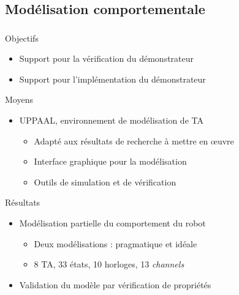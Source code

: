\documentclass{beamer}
\begin{document}
    \subsection{Modélisation comportementale}
      \begin{frame}
        \frametitle{\secname}
        \framesubtitle{\subsecname}

        \begin{block}{Objectifs}
          \begin{itemize}
            \item Support pour la vérification du démonstrateur
            \item Support pour l'implémentation du démonstrateur
          \end{itemize}
        \end{block}
        \pause

        \begin{block}{Moyens}
          \begin{itemize}
            \item {\footnotesize\cite{larsen97}} UPPAAL, environnement de
              modélisation de TA
              \begin{itemize}
                \item Adapté aux résultats de recherche à mettre en \oe uvre  
                \item Interface graphique pour la modélisation
                \item Outils de simulation et de vérification
              \end{itemize}
          \end{itemize}
        \end{block}

        \pause
        \begin{block}{Résultats}
          \begin{itemize}
            \item Modélisation partielle du comportement du robot
              \begin{itemize}
                \item Deux modélisations : pragmatique et idéale
                \item 8 TA, 33 états, 10 horloges, 13 {\it channels}
              \end{itemize}
            \item Validation du modèle par vérification de propriétés
          \end{itemize}
        \end{block}
      \end{frame}
\end{document}
